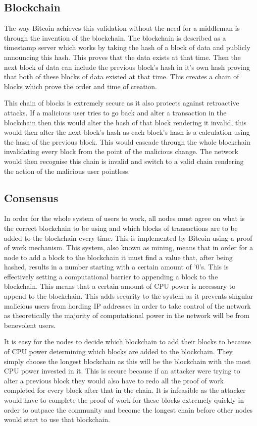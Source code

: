 \documentclass{l4proj}
\begin{document}
\subsection{Blockchain}
The way Bitcoin achieves this validation without the need for a middleman is through the invention of the blockchain.
The blockchain is described as a timestamp server which works by taking the hash of a block of data and publicly
announcing this hash. This proves that the data exists at that time. Then the next block of data can include the
previous block's hash in it's own hash proving that both of these blocks of data existed at that time. This creates 
a chain of blocks which prove the order and time of creation.

This chain of blocks is extremely secure as it also protects against retroactive attacks. If a malicious user tries
to go back and alter a transaction in the blockchain then this would alter the hash of that block rendering it invalid,
this would then alter the next block's hash as each block's hash is a calculation using the hash of the previous block.
This would cascade through the whole blockchain invalidating every block from the point of the malicious change. The 
network would then recognise this chain is invalid and switch to a valid chain rendering the action of the malicious
user pointless.

\subsection{Consensus}
In order for the whole system of users to work, all nodes must agree on what is the correct blockchain to be using and
which blocks of transactions are to be added to the blockchain every time. This is implemented by Bitcoin using a proof of
work mechanism. This system, also known as mining, means that in order for a node to add a block to the blockchain it
must find a value that, after being hashed, results in a number starting with a certain amount of '0's. This is 
effectively setting a computational barrier to appending a block to the blockchain. This means that a certain amount of
CPU power is necessary to append to the blockchain. This adds security to the system as it prevents singular malicious
users from hording IP addresses in order to take control of the network as theoretically the majority of computational
power in the network will be from benevolent users.


It is easy for the nodes to decide which blockchain to add their blocks to because of CPU power
determining which blocks are added to the blockchain. They simply choose the longest blockchain as this will be
the blockchain with the most CPU power invested in it. This is secure because if an attacker were trying to alter a 
previous block they would also have to redo all the proof of work completed for every block after that in the chain.
It is infeasible as the attacker would have to complete the proof of work for these blocks extremely quickly in order
to outpace the community and become the longest chain before other nodes would start to use that blockchain.
\end{document}
